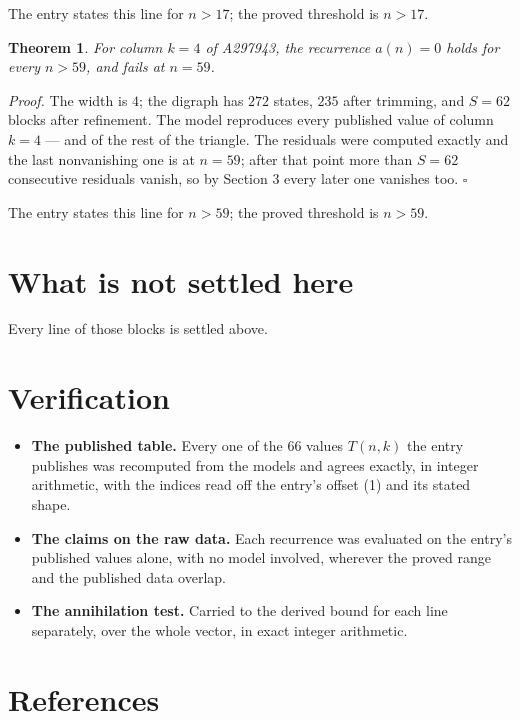 \documentclass[11pt]{article}
\newtheorem{theorem}{Theorem}
\theoremstyle{definition}
\begin{document}
The entry states this line for $n > 17$; the proved threshold is $n > 17$.

\begin{theorem} For column $k = 4$ of A297943, the recurrence $a(n) = 0$ holds for every $n > 59$, and fails at $n = 59$.\end{theorem}

{\itshape Proof.} The width is $4$; the digraph has $272$ states, $235$ after trimming, and $S = 62$ blocks after refinement. The model reproduces every published value of column $k = 4$ --- and of the rest of the triangle. The residuals were computed exactly and the last nonvanishing one is at $n = 59$; after that point more than $S = 62$ consecutive residuals vanish, so by Section 3 every later one vanishes too. $\square$

The entry states this line for $n > 59$; the proved threshold is $n > 59$.

\section{What is not settled here}

Every line of those blocks is settled above.

\section{Verification}

\begin{itemize}

\item {\bfseries The published table.} Every one of the 66 values $T(n,k)$ the entry publishes was recomputed from the models and agrees exactly, in integer arithmetic, with the indices read off the entry's offset (1) and its stated shape.

\item {\bfseries The claims on the raw data.} Each recurrence was evaluated on the entry's published values alone, with no model involved, wherever the proved range and the published data overlap.

\item {\bfseries The annihilation test.} Carried to the derived bound for each line separately, over the whole vector, in exact integer arithmetic.

\end{itemize}

\section{References}
\end{document}
